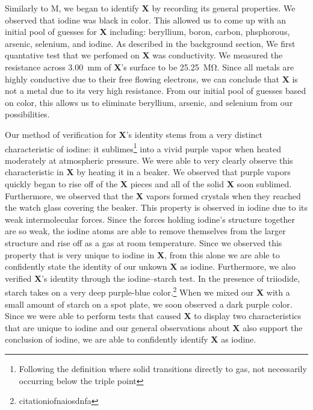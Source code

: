 \documentclass[titlepage]{article}
\begin{document}
\bigskip
Similarly to M, we began to identify \textbf{X} by recording its general properties. We observed that iodine was black in color. This allowed us to come up with an initial pool of guesses for \textbf{X} including: beryllium, boron, carbon, phsphorous, arsenic, selenium, and iodine. As described in the background section, We first quantative test that we perfomed on \textbf{X} was conductivity. We measured the resistance across \qty{3.00}{\mm} of \textbf{X}'s surface to be \qty{25.25}{\mega\ohm}. Since all metals are highly conductive due to their free flowing electrons, we can conclude that \textbf{X} is not a metal due to its very high resistance. From our initial pool of guesses based on color, this allows us to eliminate beryllium, arsenic, and selenium from our possibilities. 

Our method of verification for \textbf{X}'s identity stems from a very distinct characteristic of iodine: it sublimes\footnote{Following the definition where solid transitions directly to gas, not necessarily occurring below the triple point} into a vivid purple vapor when heated moderately at atmospheric pressure. We were able to very clearly observe this characteristic in \textbf{X} by heating it in a beaker. We observed that purple vapors quickly began to rise off of the \textbf{X} pieces and all of the solid \textbf{X} soon sublimed. Furthermore, we observed that the \textbf{X} vapors formed crystals when they reached the watch glass covering the beaker. This property is observed in iodine due to its weak intermolecular forces. Since the forces holding iodine's structure together are so weak, the iodine atoms are able to remove themselves from the larger structure and rise off as a gas at room temperature. Since we observed this property that is very unique to iodine in \textbf{X}, from this alone we are able to confidently state the identity of our unkown \textbf{X} as iodine. Furthermore, we also verified \textbf{X}'s identity through the iodine--starch test. In the presence of triiodide, starch takes on a very deep purple-blue color.\footnote{citationiofnaiosdnfa} When we mixed our \textbf{X} with a small amount of starch on a spot plate, we soon observed a dark purple color. Since we were able to perform tests that caused \textbf{X} to display two characteristics that are unique to iodine and our general observations about \textbf{X} also support the conclusion of iodine, we are able to confidently identify \textbf{X} as iodine.
\bigskip
\end{document}

